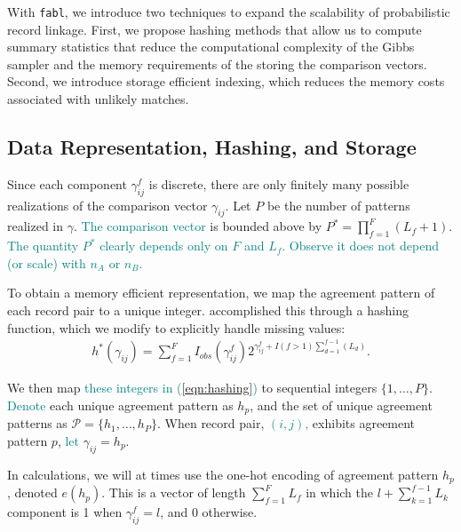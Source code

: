 \documentclass[ba]{imsart}
\begin{document}
With \texttt{fabl}, we introduce two techniques to expand the scalability of probabilistic record linkage. First, we propose hashing methods that allow us to compute summary statistics that reduce the computational complexity of the Gibbs sampler and the memory requirements of the storing the comparison vectors. Second, we introduce storage efficient indexing, which reduces the memory costs associated with unlikely matches. 


\hypertarget{data-representation-hashing-and-storage}{%
	\subsection{Data Representation, Hashing, and
		Storage}\label{data-representation-hashing-and-storage}}
	
Since each component $\gamma_{ij}^f$ is discrete, there are only finitely many possible realizations of the comparison vector $\gamma_{ij}$. Let $P$ be the number of patterns realized in $\gamma$. 
\textcolor{teal}{The comparison vector} is
 bounded above by $P^{*} =  \prod_{f=1}^F (L_f + 1).$
\textcolor{teal}{The quantity $P^{*}$ clearly depends only on $F$ and $L_f.$ Observe it does not depend (or scale) with $n_A$ or $n_B.$}

To obtain a memory efficient representation, we map the agreement pattern of each record pair to a unique integer. \cite{enamorado2019using} accomplished this through a hashing function, which we modify to explicitly handle missing values:
\begin{align}
	\label{eqn:hashing}
	h^{*}(\gamma_{ij}) = \sum_{f = 1}^F I_{obs}(\gamma_{ij}^f)2^{\gamma_{ij}^f + I(f>1)\sum_{d=1}^{f-1}(L_d)}.
\end{align}

We then map \textcolor{teal}{these integers in (\ref{eqn:hashing})} to sequential integers $\{1, \ldots, P\}$. \textcolor{teal}{Denote} each unique agreement pattern as $h_p$, and the set of unique agreement patterns as $\mathcal{P} = \{h_1, \ldots, h_P\}$. When record pair, \textcolor{teal}{$(i,j)$,} exhibits agreement pattern $p$, \textcolor{teal}{let} $\gamma_{ij} = h_p$. 

In calculations, we will at times use the one-hot encoding of agreement pattern $h_p$, denoted $e(h_p)$. This is a vector of length $\sum_{f=1}^F L_f$ in which the $l + \sum_{k=1}^{f-1} L_k$ component is 1 when $\gamma_{ij}^f = l$, and 0 otherwise. 
\end{document}
